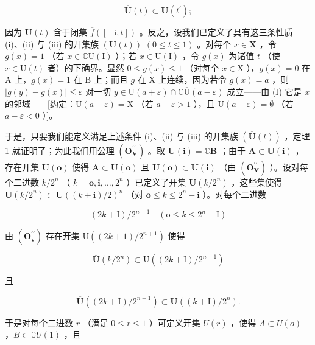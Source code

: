 \[
\overline {{{\mathbf {U}}}} (t) \subset \mathbf {U} (t ^ {\prime});\tag{1}
\]

因为 \(\mathbf{U}(t)\) 含于闭集 \(\overline{f}([-\mathrm{i}, t])\) 。反之，设我们已定义了具有这三条性质 (i)、(ii) 与 (iii) 的开集族 \((\mathbf{U}(t))\) \((0 \leqslant t \leqslant 1)\) 。对每个 \(x \in \mathbf{X}\) ，令 \(g(x) = 1\) （若 \(x \in \mathbb{C}\mathrm{U}(\mathrm{I})\) ）；若 \(x \in \mathrm{U}(\mathrm{I})\) ，令 \(g(x)\) 为诸值 \(t\) （使 \(x \in \mathrm{U}(t)\) 者）的下确界。显然 \(0 \leqslant g(x) \leqslant 1\) （对每个 \(x \in \mathrm{X}\) ），\(g(x) = 0\) 在 \(\mathrm{A}\) 上，\(g(x) = 1\) 在 \(\mathrm{B}\) 上；而且 \(g\) 在 \(\mathrm{X}\) 上连续，因为若令 \(g(x) = a\) ，则 \(|g(y) - g(x)| \leqslant \varepsilon\) 对一切 \(y \in \mathrm{U}(a + \varepsilon) \cap \mathbb{C}\overline{\mathrm{U}}(a - \varepsilon)\) 成立——由 (I) 它是 \(x\) 的邻域——{[}约定：\(\mathrm{U}(a + \varepsilon) = \mathrm{X}\) （若 \(a + \varepsilon > 1\) ），且 \(\mathrm{U}(a - \varepsilon) = \emptyset\) （若 \(a - \varepsilon < 0\) ）{]}。

于是，只要我们能定义满足上述条件 (i)、(ii) 与 (iii) 的开集族 \((\overline{\mathbf{U}}(t))\) ，定理 1 就证明了；为此我们用公理 \((\mathbf{O}_{\mathbf{V}}^{\prime \prime})\) 。取 \(\mathbf{U}(\mathbf{i}) = \mathbb{C}\mathbf{B}\) ；由于 \(\mathbf{A} \subset \mathbf{U}(\mathbf{i})\) ，存在开集 \(\mathbf{U}(\mathbf{o})\) 使得 \(\mathbf{A} \subset \mathbf{U}(\mathbf{o})\) 且 \(\mathbf{U}(\mathbf{o}) \subset \mathbf{U}(\mathbf{i})\) （由 \((\mathbf{O}_{\mathbf{V}}^{\prime \prime})\) ）。设对每个二进数 \(k / 2^n\) （ \(k = \mathbf{o}, \mathbf{i}, \ldots, 2^n\) ）已定义了开集 \(\mathbf{U}(k / 2^n)\) ，这些集使得 \(\overline{\mathbf{U}}(k / 2^n) \subset \mathbf{U}((k + \mathbf{i}) / 2)^n\) （对 \(\mathbf{o} \leqslant k \leqslant 2^n - \mathbf{i}\) ）。对每个二进数

\[
(2 k + \mathrm{I}) / 2 ^ {n + 1} \quad (\mathrm{o} \leqslant k \leqslant 2 ^ {n} - \mathrm{I})
\]

由 \((\mathbf{O}_{\mathbf{v}}^{\prime \prime})\) 存在开集 \(\mathrm{U}((2k + 1) / 2^{n + 1})\) 使得

\[
\overline {{{{\mathbf {U}}}}} (k / 2 ^ {n}) \subset \mathrm{U} ((2 k + \mathrm{I}) / 2 ^ {n + 1})
\]

且

\[
\overline {{{\mathbf {U}}}} ((2 k + \mathrm{I}) / 2 ^ {n + 1}) \subset \mathbf {U} ((k + \mathrm{I}) / 2 ^ {n}).
\]

于是对每个二进数 \(r\) （满足 \(0 \leqslant r \leqslant 1\) ）可定义开集 \(U(r)\) ，使得 \(A \subset U(o)\) ，\(B \subset \complement U(1)\) ，且

